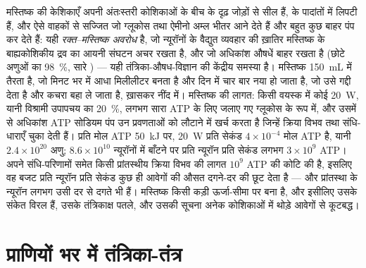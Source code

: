 \begin{proposition}\label{prop:b3:nervous-systems:barrier-budget}
मस्तिष्क की केशिकाएँ अपनी अंतःस्तरी कोशिकाओं के बीच के दृढ़ जोड़ों से
सील हैं,  के पादांतों में लिपटी हैं, और ऐसे वाहकों से
सज्जित जो ग्लूकोस तथा ऐमीनो अम्ल भीतर आने देते हैं और बहुत कुछ बाहर
पंप कर देते हैं: यही \emph{रक्त--मस्तिष्क अवरोध} है, जो न्यूरॉनों के
वैद्युत व्यवहार की ख़ातिर मस्तिष्क के बाह्यकोशिकीय द्रव का आयनी संघटन
अचर रखता है, और जो अधिकांश औषधें बाहर रखता है (छोटे अणुओं का
\qty{98}{\%}, सारे ) --- यही तंत्रिका-औषध-विज्ञान की केंद्रीय
समस्या है। मस्तिष्क \qty{150}{mL} \emph{} में
तैरता है, जो मिनट भर में आधा मिलीलीटर बनता है और दिन में चार बार नया हो
जाता है, जो उसे गद्दी देता है और कचरा बहा ले जाता है, ख़ासकर नींद में।
मस्तिष्क की लागत: किसी वयस्क में कोई \qty{20}{W}, यानी विश्रामी उपापचय
का \qty{20}{\%}, लगभग सारा ATP के लिए जलाए गए ग्लूकोस के रूप में, और
उसमें से अधिकांश ATP सोडियम पंप उन प्रवणताओं को लौटाने में खर्च करता है
जिन्हें क्रिया विभव तथा संधि-धाराएँ चुका देती हैं। प्रति मोल ATP
\qty{50}{kJ} पर, \qty{20}{W} प्रति सेकंड $4\times 10^{-4}$ मोल
ATP है, यानी $2.4\times 10^{20}$ अणु; $8.6\times 10^{10}$ न्यूरॉनों में
बाँटने पर प्रति न्यूरॉन प्रति सेकंड लगभग $3\times 10^{9}$ ATP। अपने
संधि-परिणामों समेत किसी प्रांतस्थीय क्रिया विभव की लागत $10^{9}$ ATP की
कोटि की है, इसलिए वह बजट प्रति न्यूरॉन प्रति सेकंड कुछ ही आवेगों की औसत
दगने-दर की छूट देता है --- और प्रांतस्था के न्यूरॉन लगभग उसी दर से दगते
भी हैं। मस्तिष्क किसी कड़ी ऊर्जा-सीमा पर बना है, और इसीलिए उसके संकेत
विरल हैं, उसके तंत्रिकाक्ष पतले, और उसकी सूचना अनेक कोशिकाओं में थोड़े
आवेगों से कूटबद्ध।
\end{proposition}
\admitted

\section{प्राणियों भर में तंत्रिका-तंत्र}


